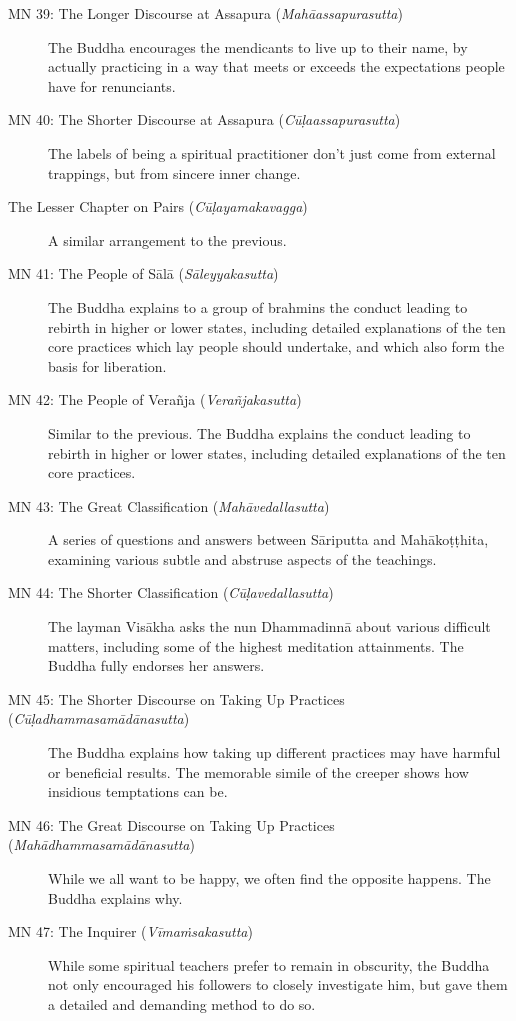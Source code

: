 \documentclass[12pt,openany]{book}%
\begin{document}
\begin{description}
\item[MN 39: The Longer Discourse at Assapura (\textit{\textsanskrit{Mahāassapurasutta}})] The Buddha encourages the mendicants to live up to their name, by actually practicing in a way that meets or exceeds the expectations people have for renunciants.%
\item[MN 40: The Shorter Discourse at Assapura (\textit{\textsanskrit{Cūḷaassapurasutta}})] The labels of being a spiritual practitioner don’t just come from external trappings, but from sincere inner change.%
\item[The Lesser Chapter on Pairs (\textit{\textsanskrit{Cūḷayamakavagga}})] A similar arrangement to the previous.%
\item[MN 41: The People of \textsanskrit{Sālā} (\textit{\textsanskrit{Sāleyyakasutta}})] The Buddha explains to a group of brahmins the conduct leading to rebirth in higher or lower states, including detailed explanations of the ten core practices which lay people should undertake, and which also form the basis for liberation.%
\item[MN 42: The People of \textsanskrit{Verañja} (\textit{\textsanskrit{Verañjakasutta}})] Similar to the previous. The Buddha explains the conduct leading to rebirth in higher or lower states, including detailed explanations of the ten core practices.%
\item[MN 43: The Great Classification (\textit{\textsanskrit{Mahāvedallasutta}})] A series of questions and answers between \textsanskrit{Sāriputta} and \textsanskrit{Mahākoṭṭhita}, examining various subtle and abstruse aspects of the teachings.%
\item[MN 44: The Shorter Classification (\textit{\textsanskrit{Cūḷavedallasutta}})] The layman \textsanskrit{Visākha} asks the nun \textsanskrit{Dhammadinnā} about various difficult matters, including some of the highest meditation attainments. The Buddha fully endorses her answers.%
\item[MN 45: The Shorter Discourse on Taking Up Practices (\textit{\textsanskrit{Cūḷadhammasamādānasutta}})] The Buddha explains how taking up different practices may have harmful or beneficial results. The memorable simile of the creeper shows how insidious temptations can be.%
\item[MN 46: The Great Discourse on Taking Up Practices (\textit{\textsanskrit{Mahādhammasamādānasutta}})] While we all want to be happy, we often find the opposite happens. The Buddha explains why.%
\item[MN 47: The Inquirer (\textit{\textsanskrit{Vīmaṁsakasutta}})] While some spiritual teachers prefer to remain in obscurity, the Buddha not only encouraged his followers to closely investigate him, but gave them a detailed and demanding method to do so.%

\end{description}
\end{document}
